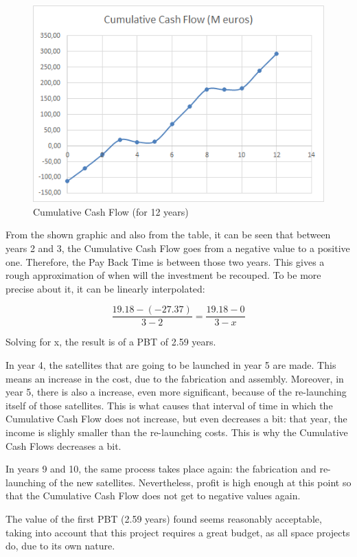 \begin{figure}
	\centering
	\includegraphics{CCF.png}
	\caption[Cumulative Cash Flow]{Cumulative Cash Flow (for 12 years)}
\end{figure}

From the shown graphic and also from the table, it can be seen that between years 2 and 3, the Cumulative Cash Flow goes from a negative value to a positive one. Therefore, the Pay Back Time is between those two years. This gives a rough approximation of when will the investment be recouped. To be more precise about it, it can be linearly interpolated:

\begin{equation}
\frac{19.18-(-27.37)}{3-2}=\frac{19.18-0}{3-x}
\end{equation}

Solving for x, the result is of a PBT of 2.59 years.

In year 4, the satellites that are going to be launched in year 5 are made. This means an increase in the cost, due to the fabrication and assembly. Moreover, in year 5, there is also a increase, even more significant, because of the re-launching itself of those satellites. This is what causes that interval of time in which the Cumulative Cash Flow does not increase, but even decreases a bit: that year, the income is slighly smaller than the re-launching costs. This is why the Cumulative Cash Flows decreases a bit.

In years 9 and 10, the same process takes place again: the fabrication and re-launching of the new satellites. Nevertheless, profit is high enough at this point so that the Cumulative Cash Flow does not get to negative values again. 

The value of the first PBT (2.59 years) found seems reasonably acceptable, taking into account that this project requires a great budget, as all space projects do, due to its own nature. 




